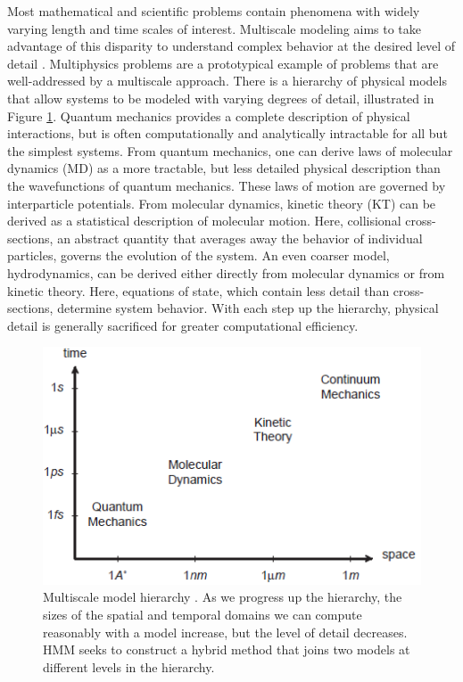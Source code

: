 \documentclass{article}
\begin{document}
Most mathematical and scientific problems contain phenomena with widely varying length and time scales of interest. Multiscale modeling aims to take advantage of this disparity to understand complex behavior at the desired level of detail \cite{weinan2011principles}. Multiphysics problems are a prototypical example of problems that are well-addressed by a multiscale approach. There is a hierarchy of physical models that allow systems to be modeled with varying degrees of detail, illustrated in Figure \ref{HMMhierarchy}. Quantum mechanics provides a complete description of physical interactions, but is often computationally and analytically intractable for all but the simplest systems. From quantum mechanics, one can derive laws of molecular dynamics (MD) as a more tractable, but less detailed physical description than the wavefunctions of quantum mechanics. These laws of motion are governed by interparticle potentials. From molecular dynamics, kinetic theory (KT) can be derived as a statistical description of molecular motion. Here, collisional cross-sections, an abstract quantity that averages away the behavior of individual particles, governs the evolution of the system. An even coarser model, hydrodynamics, can be derived either directly from molecular dynamics or from kinetic theory. Here, equations of state, which contain less detail than cross-sections, determine system behavior. With each step up the hierarchy, physical detail is generally sacrificed for greater computational efficiency.

\begin{figure}[h]
    \center \includegraphics[width=0.7\linewidth]{hierarchy.png}
    \caption{Multiscale model hierarchy \protect\cite{weinan2007heterogeneous}. As we progress up the hierarchy, the sizes of the spatial and temporal domains we can compute reasonably with a model increase, but the level of detail decreases. HMM seeks to construct a hybrid method that joins two models at different levels in the hierarchy.}
	\label{HMMhierarchy}
\end{figure}
\end{document}
